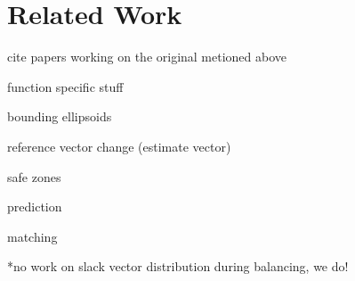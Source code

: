 \chapter{Related Work} \label{chap:relWork}

cite papers working on the original metioned above

function specific stuff

bounding ellipsoids

reference vector change (estimate vector)

safe zones

prediction

matching

*no work on slack vector distribution during balancing, we do!